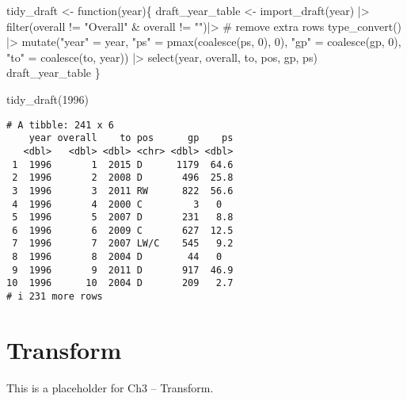\documentclass[
  letterpaper,
  DIV=11,
  numbers=noendperiod]{scrreprt}
\newenvironment{Shaded}{\begin{snugshade}}{\end{snugshade}}
\newcommand{\CommentTok}[1]{\textcolor[rgb]{0.37,0.37,0.37}{#1}}
\newcommand{\ControlFlowTok}[1]{\textcolor[rgb]{0.00,0.23,0.31}{#1}}
\newcommand{\DecValTok}[1]{\textcolor[rgb]{0.68,0.00,0.00}{#1}}
\newcommand{\FunctionTok}[1]{\textcolor[rgb]{0.28,0.35,0.67}{#1}}
\newcommand{\NormalTok}[1]{\textcolor[rgb]{0.00,0.23,0.31}{#1}}
\newcommand{\OtherTok}[1]{\textcolor[rgb]{0.00,0.23,0.31}{#1}}
\newcommand{\SpecialCharTok}[1]{\textcolor[rgb]{0.37,0.37,0.37}{#1}}
\newcommand{\StringTok}[1]{\textcolor[rgb]{0.13,0.47,0.30}{#1}}
\begin{document}
\begin{Shaded}
\begin{Highlighting}[]
\NormalTok{tidy\_draft }\OtherTok{\textless{}{-}} \ControlFlowTok{function}\NormalTok{(year)\{}
\NormalTok{  draft\_year\_table }\OtherTok{\textless{}{-}} \FunctionTok{import\_draft}\NormalTok{(year) }\SpecialCharTok{|\textgreater{}} 
    \FunctionTok{filter}\NormalTok{(overall }\SpecialCharTok{!=} \StringTok{"Overall"} \SpecialCharTok{\&}\NormalTok{ overall }\SpecialCharTok{!=} \StringTok{""}\NormalTok{)}\SpecialCharTok{|\textgreater{}} \CommentTok{\# remove extra rows}
    \FunctionTok{type\_convert}\NormalTok{() }\SpecialCharTok{|\textgreater{}} 
    \FunctionTok{mutate}\NormalTok{(}\StringTok{"year"} \OtherTok{=}\NormalTok{ year, }\StringTok{"ps"} \OtherTok{=} \FunctionTok{pmax}\NormalTok{(}\FunctionTok{coalesce}\NormalTok{(ps, }\DecValTok{0}\NormalTok{), }\DecValTok{0}\NormalTok{), }
           \StringTok{"gp"} \OtherTok{=} \FunctionTok{coalesce}\NormalTok{(gp, }\DecValTok{0}\NormalTok{), }\StringTok{"to"} \OtherTok{=} \FunctionTok{coalesce}\NormalTok{(to, year)) }\SpecialCharTok{|\textgreater{}} 
    \FunctionTok{select}\NormalTok{(year, overall, to, pos, gp, ps)}
\NormalTok{  draft\_year\_table}
\NormalTok{\}}

\FunctionTok{tidy\_draft}\NormalTok{(}\DecValTok{1996}\NormalTok{)}
\end{Highlighting}
\end{Shaded}

\begin{verbatim}
# A tibble: 241 x 6
    year overall    to pos      gp    ps
   <dbl>   <dbl> <dbl> <chr> <dbl> <dbl>
 1  1996       1  2015 D      1179  64.6
 2  1996       2  2008 D       496  25.8
 3  1996       3  2011 RW      822  56.6
 4  1996       4  2000 C         3   0  
 5  1996       5  2007 D       231   8.8
 6  1996       6  2009 C       627  12.5
 7  1996       7  2007 LW/C    545   9.2
 8  1996       8  2004 D        44   0  
 9  1996       9  2011 D       917  46.9
10  1996      10  2004 D       209   2.7
# i 231 more rows
\end{verbatim}


\chapter{Transform}\label{transform}

This is a placeholder for Ch3 -- Transform.

\end{document}
